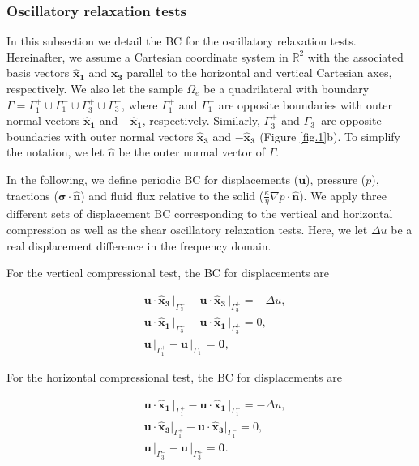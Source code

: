 \documentclass[draft]{agujournal2019}
\begin{document}
\subsubsection{Oscillatory relaxation tests}
In this subsection we detail the BC for the oscillatory relaxation tests. 
Hereinafter, we assume a Cartesian coordinate system in $\mathbb R^2$ with the associated basis vectors $\bm{\hat x_1}$ and $\bm{\hat x_3}$ parallel to the horizontal and vertical Cartesian axes, respectively. We also
let the sample $\Omega_e$ be a quadrilateral with boundary $\Gamma = \Gamma_1^+ \cup \Gamma_1^- \cup \Gamma_3^+ \cup \Gamma_3^- $, where $\Gamma_1^+ $ and $\Gamma_1^- $ are opposite boundaries with outer normal vectors $\bm{\hat x_1}$ and $ -\bm{\hat x_1}$, respectively. Similarly, $\Gamma_3^+ $ and $\Gamma_3^- $ are opposite boundaries with outer normal vectors $\bm{\hat x_3}$ and $ -\bm{\hat x_3}$ (Figure \ref{fig.1}b). To simplify the notation, we let $ \bm{\hat n}$ be the outer normal vector
of $\Gamma$.

In the following, we define periodic BC for displacements ($\bm{u}$), pressure ($p$), tractions ($\bm{\sigma}\cdot \bm{\hat n} $) and fluid flux relative to the solid ($\frac{\kappa}{\eta} \nabla p \cdot \bm{\hat n}$). We apply three different sets of displacement BC corresponding to the vertical and horizontal compression as well as the shear oscillatory relaxation tests. Here, we let $\Delta u$ be a real displacement difference in the frequency domain.

For the vertical compressional test, the BC for displacements are
\begin{linenomath*}
\begin{equation}\label{Eq.8}
\begin{split}
&  \bm{u} \cdot \bm{\hat{x}_3} \, \vert_{\Gamma_3^-} - \bm{u}\cdot \bm{\hat{x}_3}\, \vert_{\Gamma_3^+} =- \Delta u, \\
&  \bm{u} \cdot \bm{\hat{x}_1}\, \vert_{\Gamma_3^-} - \bm{u} \cdot \bm{\hat{x}_1} \, \vert_{\Gamma_3^+} = 0, \\
& \bm{u}\,\vert_{\Gamma_1^+} - \bm{u}\,\vert_{\Gamma_1^-} = \bm{0},
\end{split}
\end{equation}
\end{linenomath*}

For the horizontal compressional test, the BC for displacements are
\begin{linenomath*}
\begin{equation}\label{Eq.9}
\begin{split}
& \bm{u} \cdot \bm{\hat{x}_1}\, \vert_{\Gamma_1^+}-\bm{u} \cdot \bm{\hat{x}_1}\, \vert_{\Gamma_1^-} = - \Delta u, \\
& \bm{u} \cdot \bm{\hat{x}_3} \vert_{\Gamma_1^+}- \bm{u} \cdot \bm{\hat{x}_3}\vert_{\Gamma_1^-} =  0,  \\
& \bm{u}\,\vert_{\Gamma_3^-}- \bm{u}\,\vert_{\Gamma_3^+} = \bm{0}.
\end{split}
\end{equation}
\end{linenomath*}
\end{document}
